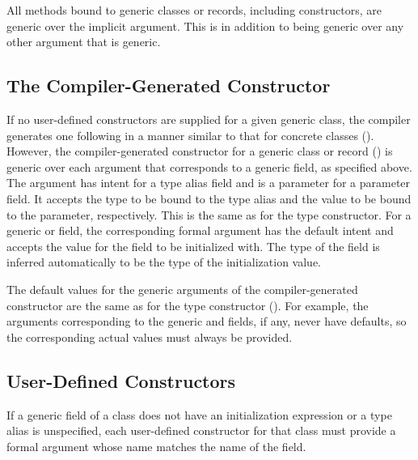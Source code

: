 All methods bound to generic classes or records, including
constructors, are generic over the implicit  argument.
This is in addition to being generic over any other argument that is generic.

\subsection{The Compiler-Generated Constructor}
\label{Generic_Compiler_Generated_Constructors}

If no user-defined constructors are supplied for a given generic class, the
compiler generates one following in a manner similar to that for concrete
classes ().
However, the compiler-generated constructor for a generic class or record
() is generic over each argument that
corresponds to a generic field, as specified above.
The argument has intent  for a type alias field and is a
parameter for a parameter field. It accepts the type to be bound
to the type alias and the value to be bound to the parameter, respectively.
This is the same as for the type constructor.
For a generic  or  field, the corresponding
formal argument has the default intent and accepts the value
for the field to be initialized with. The type of the field
is inferred automatically to be the type of the initialization value.

The default values for the generic arguments of the compiler-generated constructor
are the same as for the type constructor ().
For example, the arguments corresponding to the generic 
and  fields, if any, never have defaults, so the corresponding
actual values must always be provided.

\subsection{User-Defined Constructors}
\label{Generic_User_Constructors}

If a generic field of a class does not have an initialization expression
or a type alias is unspecified, each user-defined constructor for that
class must provide a formal argument whose name
matches the name of the field.

